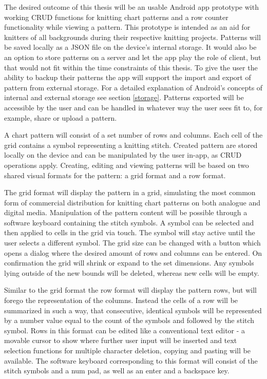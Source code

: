 The desired outcome of this thesis will be an usable Android app prototype with working CRUD functions for knitting chart patterns and a row counter functionality while viewing a pattern. This prototype is intended as an aid for knitters of all backgrounds during their respective knitting projects. Patterns will be saved locally as a \gls{JSON} file on the device's internal storage. It would also be an option to store patterns on a server and let the app play the role of client, but that would not fit within the time constraints of this thesis. To give the user the ability to backup their patterns the app will support the import and export of pattern from external storage. For a detailed explanation of Android's concepts of internal and external storage see section \ref{storage}. Patterns exported will be accessible by the user and can be handled in whatever way the user sees fit to, for example, share or upload a pattern.

A chart pattern will consist of a set number of rows and columns. Each cell of the grid contains a symbol representing a knitting stitch. Created pattern are stored locally on the device and can be manipulated by the user in-app, as CRUD operations apply. Creating, editing and viewing patterns will be based on two shared visual formats for the pattern: a grid format and a row format.

The grid format will display the pattern in a grid, simulating the most common form of commercial distribution for knitting chart patterns on both analogue and digital media. Manipulation of the pattern content will be possible through a software keyboard containing the stitch symbols. A symbol can be selected and then applied to cells in the grid via touch. The symbol will stay active until the user selects a different symbol. The grid size can be changed with a button which opens a dialog where the desired amount of rows and columns can be entered. On confirmation the grid will shrink or expand to the set dimensions. Any symbols lying outside of the new bounds will be deleted, whereas new cells will be empty.

Similar to the grid format the row format will display the pattern rows, but will forego the representation of the columns. Instead the cells of a row will be summarized in such a way, that consecutive, identical symbols will be represented  by a number value equal to the count of the symbols and followed by the stitch symbol. Rows in this format can be edited like a conventional text editor - a movable cursor to show where further user input will be inserted and text selection functions for multiple character deletion, copying and pasting will be available. The software keyboard corresponding to this format will consist of the stitch symbols and a num pad, as well as an enter and a backspace key.

